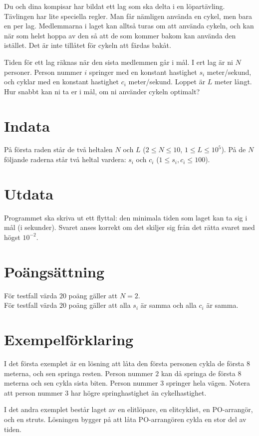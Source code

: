 Du och dina kompisar har bildat ett lag som ska delta i en löpartävling. Tävlingen har lite speciella regler.
Man får nämligen använda en cykel, men bara en per lag. Medlemmarna i laget kan alltså turas om att använda cykeln, och kan
när som helst hoppa av den så att de som kommer bakom kan använda den istället. Det är inte tillåtet för cykeln att färdas bakåt. 

Tiden för ett lag räknas när den sista medlemmen går i mål. I ert lag är ni $N$ personer. Person nummer $i$ springer med en 
konstant hastighet $s_i$ meter/sekund, och cyklar med en konstant hastighet $c_i$ meter/sekund. Loppet är $L$ meter långt.
Hur snabbt kan ni ta er i mål, om ni använder cykeln optimalt?

\section*{Indata}
På första raden står de två heltalen $N$ och $L$ ($2 \leq N \leq 10$, $1 \leq L \leq 10^5$).
På de $N$ följande raderna står två heltal vardera: $s_i$ och $c_i$ ($1 \leq s_i, c_i \leq 100$).

\section*{Utdata}
Programmet ska skriva ut ett flyttal: den minimala tiden som laget kan ta sig i mål (i sekunder).
Svaret anses korrekt om det skiljer sig från det rätta svaret med högst $10^{-2}$.

\section*{Poängsättning}
För testfall värda $20$ poäng gäller att $N=2$. \\
För testfall värda $20$ poäng gäller att alla $s_i$ är samma och alla $c_i$ är samma.

\section*{Exempelförklaring}
I det första exemplet är en lösning att låta den första personen cykla de första $8$ meterna, och sen springa resten. Person nummer $2$
kan då springa de första $8$ meterna och sen cykla sista biten. Person nummer $3$ springer hela vägen. Notera att person nummer $3$ har
högre springhastighet än cykelhastighet.

I det andra exemplet består laget av en elitlöpare, en elitcyklist, en PO-arrangör, och en struts. Lösningen bygger på att låta PO-arrangören
cykla en stor del av tiden.
